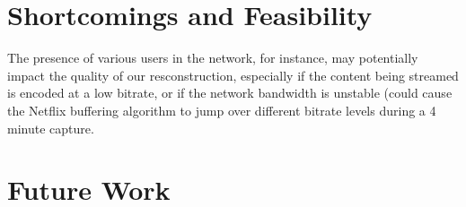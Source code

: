 \section{Shortcomings and Feasibility}


The presence of various users in the network, for instance, may potentially
impact the quality of our resconstruction, especially if the content being
streamed is encoded at a low bitrate, or if the network bandwidth is unstable
(could cause the Netflix buffering algorithm to jump over different bitrate
levels during a 4 minute capture. 

\section{Future Work}

